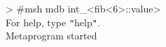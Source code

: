 
\begin{tttenv}
> \#msh mdb int\_<fib<6>::value> \\
For help, type \texttt{"}help\texttt{"}. \\
Metaprogram started
\end{tttenv}

